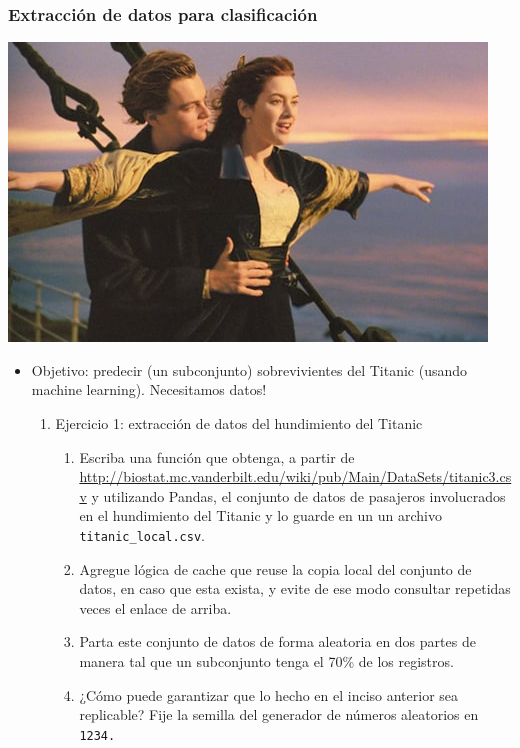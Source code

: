\documentclass[leqno, 10pt, envcountsect]{beamer}
\numberwithin{equation}{section}
\theoremstyle{definition}
\theoremstyle{example}
\numberwithin{figure}{section}
\numberwithin{table}{section}
\let\olditem\item
\renewcommand{\item}{%
\olditem\vspace{1pt}}
\begin{document}
\begin{frame}
  \frametitle{Extracción de datos para clasificación}
  \begin{center}
    \includegraphics[scale=0.3]{titanic.jpg}
  \end{center}
  \begin{itemize}
    \item Objetivo: predecir (un subconjunto) sobrevivientes del Titanic (usando machine
      learning). Necesitamos datos!
      \begin{enumerate}
            \item Ejercicio 1: extracción de datos del hundimiento del Titanic
              \begin{enumerate}
                \item Escriba una función que obtenga, a partir de
                  \href{http://biostat.mc.vanderbilt.edu/wiki/pub/Main/DataSets/titanic3.csv}{http://biostat.mc.vanderbilt.edu/wiki/pub/Main/DataSets/titanic3.csv} y utilizando Pandas, el conjunto de datos de pasajeros
                  involucrados en el hundimiento del Titanic y lo guarde en un
                  un archivo \texttt{titanic_local.csv}.
                \item Agregue lógica de cache que reuse la copia local del
                  conjunto de datos, en caso que esta exista, y evite de ese
                  modo consultar repetidas veces el enlace de arriba.
                \item Parta este conjunto de datos de forma aleatoria en dos
                  partes de manera tal que un subconjunto tenga el 70\% de los
                  registros.
                \item ¿Cómo puede garantizar que lo hecho en el inciso anterior
                  sea replicable?  Fije la semilla del generador de números
                  aleatorios en \texttt{1234.}
              \end{enumerate}
        \end{enumerate}
  \end{itemize}
\end{frame}
\end{document}
